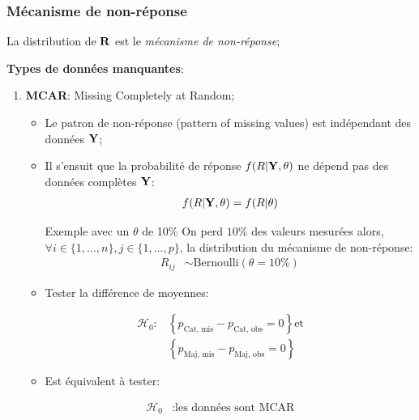 \documentclass[10pt, french]{article}
\begin{document}
\begin{multicols*}{3}
\subsubsection*{Mécanisme de non-réponse}
La distribution de $\mathbf{R}$ est le \textit{mécanisme de non-réponse};

\textbf{Types de données manquantes}:
\begin{enumerate}
	\item	\textbf{MCAR}: Missing Completely at Random;
		\begin{itemize}
		\item	Le patron de non-réponse (pattern of missing values) est indépendant des données $\mathbf{Y}$;
		\item	Il s'ensuit que la probabilité de réponse $f(R | \mathbf{Y}, \theta)$ ne dépend pas des données complètes $\mathbf{Y}$:
			\begin{align*}
			f(R | \mathbf{Y}, \theta) &= f(R | \theta) \\
			\end{align*}
		\begin{examplebox}{Exemple avec un $\theta$ de 10\%}
		On perd $10\%$ des valeurs mesurées alors, $\forall i \in \{1, \dots, n\}, j \in \{1, \dots, p\}$, la distribution du mécanisme de non-réponse:
			\begin{align*}
			R_{ij} 
			&\sim 	\text{Bernoulli}(\theta =  10\%)
			\end{align*}
		\end{examplebox}
		\item	Tester la différence de moyennes:
		\end{itemize}	
		\setlength{\mathindent}{-2cm}
			\begin{align*}
			\mathcal{H}_{0}:
			&\left\{ p_{\text{Cat, mis}} - p_{\text{Cat, obs}} = 0 \right\} 
			\text{et}	\\
			&\left\{ p_{\text{Maj, mis}} - p_{\text{Maj, obs}} = 0 \right\}
			\end{align*}
		\setlength{\mathindent}{1cm}
		\begin{itemize}
		\item[]	Est équivalent à tester: 
		\end{itemize}	
		\setlength{\mathindent}{-2cm}
			\begin{align*}
			\mathcal{H}_{0}
			&:	\text{les données sont MCAR}
			\end{align*}
		\setlength{\mathindent}{1cm}
		\begin{itemize}

\end{itemize}
\end{enumerate}
\end{multicols*}
\end{document}
